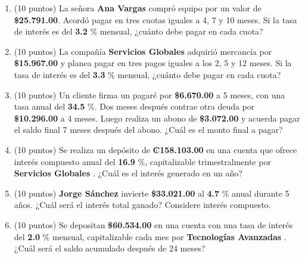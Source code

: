 \documentclass[10pt]{article}
\begin{document}
\begin{enumerate}[leftmargin=*, label=\textbf{\arabic*.}]
  \item (10 puntos) La señora \textbf{ Ana Vargas } compró equipo por un valor de \textbf{\$\num{ 25,791.00 }}. Acordó pagar en tres cuotas iguales a 4, 7 y 10 meses. Si la tasa de interés es del \textbf{ 3.2 }\% mensual, ¿cuánto debe pagar en cada cuota?

  \vspace{0.5cm}

  \item (10 puntos) La compañía \textbf{ Servicios Globales } adquirió mercancía por \textbf{\$\num{ 15,967.00 }} y planea pagar en tres pagos iguales a los 2, 5 y 12 meses. Si la tasa de interés es del \textbf{ 3.3 }\% mensual, ¿cuánto debe pagar en cada cuota?

  \vspace{0.5cm}

  \item (10 puntos) Un cliente firma un pagaré por \textbf{\$\num{ 6,670.00 }} a 5 meses, con una tasa anual del \textbf{ 34.5 }\%. Dos meses después contrae otra deuda por \textbf{\$\num{ 10,296.00 }} a 4 meses. Luego realiza un abono de \textbf{\$\num{ 3,072.00 }} y acuerda pagar el saldo final 7 meses después del abono. ¿Cuál es el monto final a pagar?

  \vspace{0.5cm}

  \item (10 puntos) Se realiza un depósito de \textbf{₡\num{ 158.103.00 }} en una cuenta que ofrece interés compuesto anual del \textbf{ 16.9 }\%, capitalizable trimestralmente por \textbf{ Servicios Globales }. ¿Cuál es el interés generado en un año?

  \vspace{0.5cm}

  \item (10 puntos) \textbf{ Jorge Sánchez } invierte \textbf{\$\num{ 33,021.00 }} al \textbf{ 4.7 }\% anual durante 5 años. ¿Cuál será el interés total ganado? Considere interés compuesto.

  \vspace{0.5cm}

  \item (10 puntos) Se depositan \textbf{\$\num{ 60,534.00 }} en una cuenta con una tasa de interés del \textbf{ 2.0 }\% mensual, capitalizable cada mes por \textbf{ Tecnologías Avanzadas }. ¿Cuál será el saldo acumulado después de 24 meses?
\end{enumerate}
\end{document}
